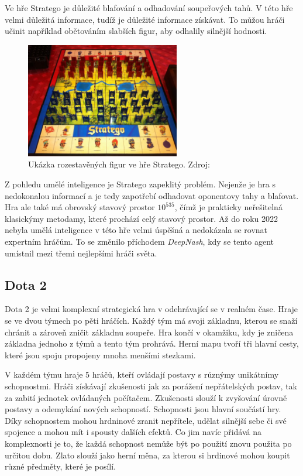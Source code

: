 Ve hře Stratego je důležité blafování a odhadování soupeřových tahů.
V této hře velmi důležitá informace, tudíž je důležité informace získávat.
To můžou hráči učinit například obětováním slabších figur, aby odhalily silnější hodnosti.

\begin{figure}[H]
	\centering
	\includegraphics[width=0.6\textwidth]{obrazky-figures/stratego}
	\caption{Ukázka rozestavěných figur ve hře Stratego.
  Zdroj:\cite{Stratego_image}}\label{fig:figure2}
\end{figure}

Z pohledu umělé inteligence je Stratego zapeklitý problém.
Nejenže je hra s nedokonalou informací a je tedy zapotřebí odhadovat oponentovy tahy a blafovat.
Hra ale také má obrovský stavový prostor $10^{535}$\cite{Perolat_2022}, čímž je prakticky neřešitelná klasickýmy metodamy, které prochází celý stavový prostor.
Až do roku 2022 nebyla umělá inteligence v této hře velmi úspěšná a nedokázala se rovnat expertním hráčům.
To se změnilo příchodem \emph{DeepNash}\cite{Perolat_2022}, kdy se tento agent umístnil mezi třemi nejlepšími hráči světa.

\subsection{Dota 2}\label{subsec:dota}
Dota 2 je velmi komplexní strategická hra v odehrávající se v realném čase.
Hraje se ve dvou týmech po pěti hráčích.
Každý tým má svoji základnu, kterou se snaží chránit a zároveň zničit základnu soupeře.
Hra končí v okamžiku, kdy je zničena základna jednoho z týmů a tento tým prohrává.
Herní mapu tvoří tři hlavní cesty, které jsou spoju propojeny mnoha menšími stezkami.

V každém týmu hraje 5 hráčů, kteří ovládají postavy s různýmy unikátnímy schopnostmi.
Hráči získávají zkušenosti jak za porážení nepřátelských postav, tak za zabití jednotek ovládaných počítačem.
Zkušenosti slouží k zvyšování úrovně postavy a odemykání nových schopností.
Schopnosti jsou hlavní součástí hry.
Díky schopnostem mohou hrdninové zranit nepřítele, udělat silnější sebe či své spojence a mohou mít i spousty dalších efektů.
Co jim navíc přidává na komplexnosti je to, že každá schopnost nemůže být po použití znovu použita po určitou dobu.
Zlato slouží jako herní měna, za kterou si hrdinové mohou koupit různé předměty, které je posílí.

